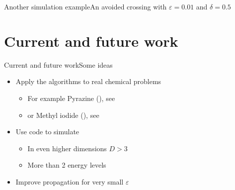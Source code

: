 \documentclass{beamer}
\begin{document}
\begin{frame}{Another simulation example}{An avoided crossing with $\varepsilon=0.01$ and $\delta=0.5$}
  \begin{figure}
    \centering
  \end{figure}
\end{frame}


\section{Current and future work}


\begin{frame}{Current and future work}{Some ideas}
  \begin{itemize}
  \item Apply the algorithms to real chemical problems
    \begin{itemize}
    \item For example Pyrazine (), see \cite{Lasser}
    \item or Methyl iodide (), see \cite{lee_heller}
    \end{itemize}
  \end{itemize}
  \begin{itemize}
  \item Use code to simulate
    \begin{itemize}
    \item In even higher dimensions $D > 3$
    \item More than 2 energy levels
    \end{itemize}
  \end{itemize}
  \begin{itemize}
  \item Improve propagation for very small $\varepsilon$
  \end{itemize}
\end{frame}
\end{document}
